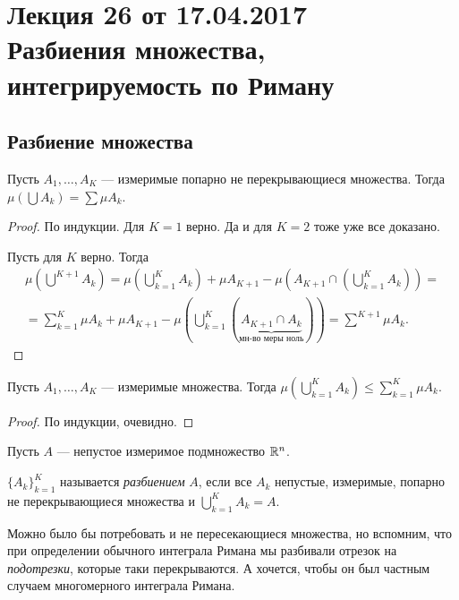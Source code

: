 \pagestyle{fancy}
\section{Лекция 26 от 17.04.2017 \\ Разбиения множества, интегрируемость по Риману}

\subsection{Разбиение множества}

\begin{Statement}
Пусть $A_1, \ldots, A_K$ --- измеримые попарно не перекрывающиеся множества. Тогда $\mu (\bigcup A_k) = \sum \mu A_k$.
\end{Statement}
\begin{proof}
По индукции. Для $K = 1$ верно. Да и для $K = 2$ тоже уже все доказано.

Пусть для $K$ верно. Тогда
\begin{gather*}
\mu\left(\bigcup\limits^{K+1} A_k\right) = \mu\left(\bigcup\limits^K_{k=1} A_k\right) + \mu A_{K+1} - \mu\left(A_{K+1} \cap \left( \bigcup\limits^K_{k=1} A_k \right)\right) = \\ = \sum\limits^K_{k=1}\mu A_k + \mu A_{K+1} - \mu \left( \bigcup\limits^K_{k=1}\left(\underbrace{A_{K+1} \cap A_k}_{\text{мн-во меры ноль}} \right) \right) = \sum\limits^{K+1}\mu A_k.
\end{gather*}
\end{proof}

\begin{Statement}
Пусть $A_1, \ldots, A_K$ --- измеримые множества. Тогда $\mu\left( \bigcup\limits^K_{k=1} A_k \right) \leq \sum\limits^K_{k=1} \mu A_k$.
\end{Statement}
\begin{proof}
По индукции, очевидно.
\end{proof}

Пусть $A$ --- непустое измеримое подмножество $\mathbb{R}^n$.

\begin{Def}
$\{ A_k \}^K_{k=1}$ называется \textit{разбиением} $A$, если все $A_k$ непустые, измеримые, попарно не перекрывающиеся множества и $\bigcup\limits^K_{k=1} A_k = A$.
\end{Def}

Можно было бы потребовать и не пересекающиеся множества, но вспомним, что при определении обычного интеграла Римана мы разбивали отрезок на \textit{подотрезки}, которые таки перекрываются. А хочется, чтобы он был частным случаем многомерного интеграла Римана.

